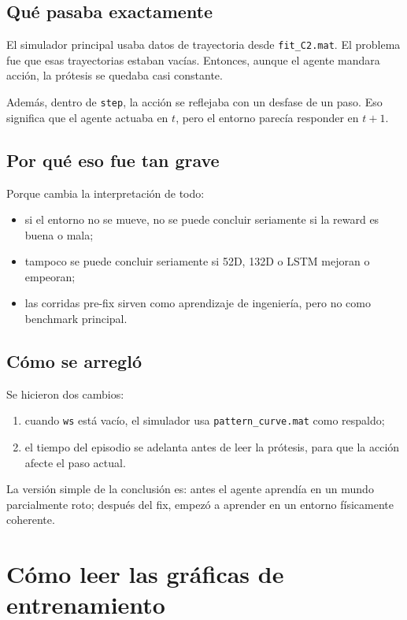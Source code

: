 \documentclass[11pt,a4paper]{article}
\begin{document}
\subsection{Qu\'e pasaba exactamente}

El simulador principal usaba datos de trayectoria desde \texttt{fit\_C2.mat}. El problema fue que esas trayectorias estaban vac\'ias. Entonces, aunque el agente mandara acci\'on, la pr\'otesis se quedaba casi constante.

Adem\'as, dentro de \texttt{step}, la acci\'on se reflejaba con un desfase de un paso. Eso significa que el agente actuaba en \(t\), pero el entorno parec\'ia responder en \(t+1\).

\subsection{Por qu\'e eso fue tan grave}

Porque cambia la interpretaci\'on de todo:
\begin{itemize}[leftmargin=1.2cm]
    \item si el entorno no se mueve, no se puede concluir seriamente si la reward es buena o mala;
    \item tampoco se puede concluir seriamente si 52D, 132D o LSTM mejoran o empeoran;
    \item las corridas pre-fix sirven como aprendizaje de ingenier\'ia, pero no como benchmark principal.
\end{itemize}

\subsection{C\'omo se arregl\'o}

Se hicieron dos cambios:
\begin{enumerate}[leftmargin=1.2cm]
    \item cuando \texttt{ws} est\'a vac\'io, el simulador usa \texttt{pattern\_curve.mat} como respaldo;
    \item el tiempo del episodio se adelanta antes de leer la pr\'otesis, para que la acci\'on afecte el paso actual.
\end{enumerate}

La versi\'on simple de la conclusi\'on es: antes el agente aprend\'ia en un mundo parcialmente roto; despu\'es del fix, empez\'o a aprender en un entorno f\'isicamente coherente.

\section{C\'omo leer las gr\'aficas de entrenamiento}
\end{document}
